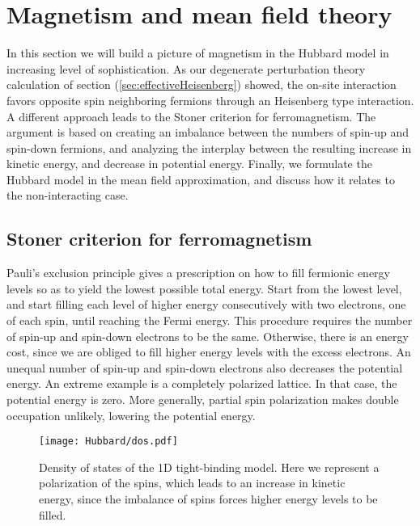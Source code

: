 \section{Magnetism and mean field theory}\label{sec:magMFT}

In this section we will build a picture of magnetism in the Hubbard model in increasing level of sophistication.
As our degenerate perturbation theory  calculation of section (\ref{sec:effectiveHeisenberg}) showed, the on-site interaction favors opposite spin neighboring fermions through an Heisenberg type interaction.
A different approach leads to the Stoner criterion for ferromagnetism.
The argument is based on creating an imbalance between the numbers of spin-up and spin-down fermions, and analyzing the interplay between the resulting increase in kinetic energy, and decrease in potential energy.
Finally, we formulate the Hubbard model in the mean field approximation, and discuss how it relates to the non-interacting case.

\subsection{Stoner criterion for ferromagnetism}
\label{subsec:stoner}

Pauli's exclusion principle gives a prescription on how to fill fermionic energy levels so as to yield the lowest possible total energy.
Start from the lowest level, and start filling each level of higher energy consecutively with two electrons, one of each spin, until reaching the Fermi energy.
This procedure requires the number of spin-up and spin-down electrons to be the same.
Otherwise, there is an energy cost, since we are obliged to fill higher energy levels with the excess electrons.
An unequal number of spin-up and spin-down electrons also decreases the potential energy.
An extreme example is a completely polarized lattice.
In that case, the potential energy is zero.
More generally, partial spin polarization makes double occupation unlikely, lowering the potential energy.
\begin{figure}[H]
	\centering
\hspace{2mm}\texttt{[image: Hubbard/dos.pdf]}
	\caption[Density of states of the \acs{1D} tight-binding model.]{Density of states of the \acs{1D} tight-binding model.
	Here we represent a polarization of the spins, which leads to an increase in kinetic energy, since the imbalance of spins forces higher energy levels to be filled.}
	\label{fig:dos}
\end{figure}


